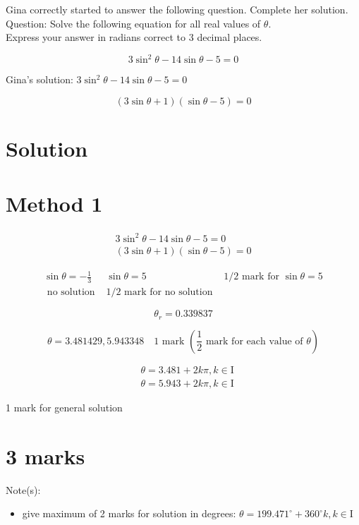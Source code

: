 \documentclass[10pt]{article}
\begin{document}
\captionsetup{singlelinecheck=false}
Gina correctly started to answer the following question. Complete her solution.\\
Question: Solve the following equation for all real values of $\theta$.\\
Express your answer in radians correct to 3 decimal places.

$$
3 \sin ^{2} \theta-14 \sin \theta-5=0
$$

Gina's solution: $3 \sin ^{2} \theta-14 \sin \theta-5=0$

$$
(3 \sin \theta+1)(\sin \theta-5)=0
$$

\section*{Solution}
\section*{Method 1}
$$
\begin{array}{r}
3 \sin ^{2} \theta-14 \sin \theta-5=0 \\
(3 \sin \theta+1)(\sin \theta-5)=0
\end{array}
$$

$$
\begin{array}{lll}
\sin \theta=-\frac{1}{3} & \sin \theta=5 & 1 / 2 \text { mark for } \sin \theta=5 \\
\text { no solution } & 1 / 2 \text { mark for no solution }
\end{array}
$$

$$
\theta_{r}=0.339837
$$

$$
\theta=3.481429,5.943348 \quad 1 \text { mark }\left(\frac{1}{2} \text { mark for each value of } \theta\right)
$$

$$
\begin{aligned}
& \theta=3.481+2 k \pi, k \in \mathrm{I} \\
& \theta=5.943+2 k \pi, k \in \mathrm{I}
\end{aligned}
$$

1 mark for general solution

\section*{3 marks}
Note(s):

\begin{itemize}
  \item give maximum of 2 marks for solution in degrees: $\theta=199.471^{\circ}+360^{\circ} k, k \in \mathrm{I}$
\end{itemize}
\end{document}
